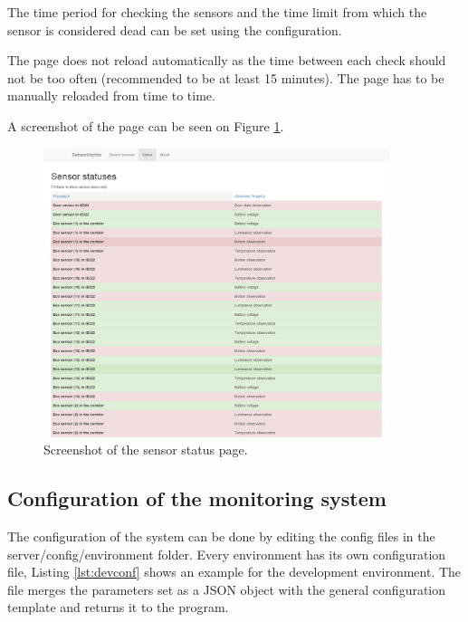 The time period for checking the sensors and the time limit from which the sensor is considered dead can be set using the configuration. 

The page does not reload automatically as the time between each check should not be too often (recommended to be at least 15 minutes). The page has to be manually reloaded from time to time.

A screenshot of the page can be seen on Figure \ref{fig:shstat}.

\begin{figure}[h]
\centering
\includegraphics[width=0.9\textwidth]{figures/shstatus.png}
\caption{Screenshot of the sensor status page.\label{fig:shstat}}
\end{figure}


\subsection{Configuration of the monitoring system}
The configuration of the system can be done by editing the config files in the  server/config/environment folder. Every environment has its own configuration file, Listing \ref{lst:devconf} shows an example for the development environment. The file merges the parameters set as a JSON object with the general configuration template and returns it to the program.


